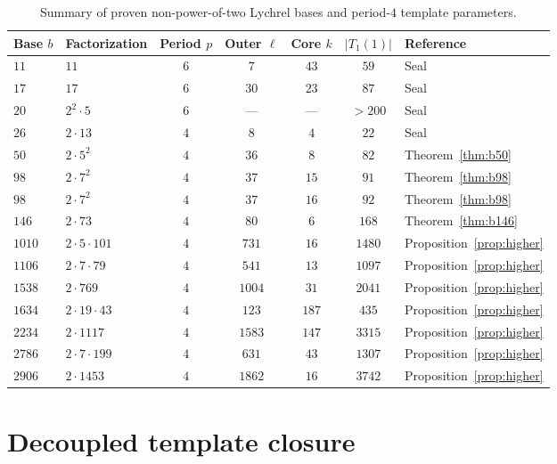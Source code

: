 \documentclass[12pt,reqno]{article}
\begin{document}
\begin{table}[H]
\begin{center}
\begin{tabular}{llccccl}
\hline
Base $b$ & Factorization & Period $p$ & Outer $\ell$ & Core $k$ & $|T_1(1)|$ & Reference \\
\hline
$11$ & $11$ & $6$ & $7$ & $43$ & $59$ & Seal \cite{seal1996} \\
$17$ & $17$ & $6$ & $30$ & $23$ & $87$ & Seal \cite{seal1996} \\
$20$ & $2^2 \cdot 5$ & $6$ & --- & --- & $>200$ & Seal \cite{seal1996} \\
$26$ & $2 \cdot 13$ & $4$ & $8$ & $4$ & $22$ & Seal \cite{seal1996} \\
\hline
$50$ & $2 \cdot 5^2$ & $4$ & $36$ & $8$ & $82$ & Theorem~\ref{thm:b50} \\
$98$ & $2 \cdot 7^2$ & $4$ & $37$ & $15$ & $91$ & Theorem~\ref{thm:b98} \\
$98$ & $2 \cdot 7^2$ & $4$ & $37$ & $16$ & $92$ & Theorem~\ref{thm:b98} \\
$146$ & $2 \cdot 73$ & $4$ & $80$ & $6$ & $168$ & Theorem~\ref{thm:b146} \\
$1010$ & $2 \cdot 5 \cdot 101$ & $4$ & $731$ & $16$ & $1480$ & Proposition~\ref{prop:higher} \\
$1106$ & $2 \cdot 7 \cdot 79$ & $4$ & $541$ & $13$ & $1097$ & Proposition~\ref{prop:higher} \\
$1538$ & $2 \cdot 769$ & $4$ & $1004$ & $31$ & $2041$ & Proposition~\ref{prop:higher} \\
$1634$ & $2 \cdot 19 \cdot 43$ & $4$ & $123$ & $187$ & $435$ & Proposition~\ref{prop:higher} \\
$2234$ & $2 \cdot 1117$ & $4$ & $1583$ & $147$ & $3315$ & Proposition~\ref{prop:higher} \\
$2786$ & $2 \cdot 7 \cdot 199$ & $4$ & $631$ & $43$ & $1307$ & Proposition~\ref{prop:higher} \\
$2906$ & $2 \cdot 1453$ & $4$ & $1862$ & $16$ & $3742$ & Proposition~\ref{prop:higher} \\
\hline
\end{tabular}
\caption{Summary of proven non-power-of-two Lychrel bases and period-$4$ template parameters.}
\label{tab:bases}
\end{center}
\end{table}

\section{Decoupled template closure}\label{sec:closure}
\end{document}
